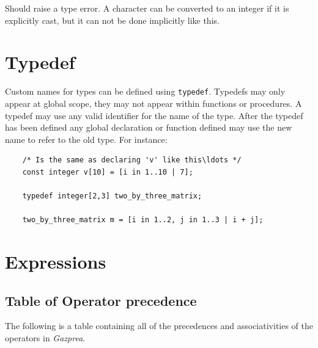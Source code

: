 \documentclass{article}
\begin{document}
  Should raise a type error. A character can be converted to an integer if it is explicitly cast, but it can not be
  done implicitly like this.


\section{Typedef}\label{sec:typedef}

  Custom names for types can be defined using \texttt{typedef}. Typedefs may only appear at global scope, they may not
  appear within functions or procedures. A typedef may use any valid identifier for the name of the type. After the
  typedef has been defined any global declaration or function defined may use the new name to refer to the old type.
  For instance:

  \begin{lstlisting}
    /* Is the same as declaring 'v' like this\ldots */
    const integer v[10] = [i in 1..10 | 7];

    typedef integer[2,3] two_by_three_matrix;

    two_by_three_matrix m = [i in 1..2, j in 1..3 | i + j];
  \end{lstlisting}


\section{Expressions}\label{sec:expressions}

  \subsection{Table of Operator precedence}\label{sec:operators}

    The following is a table containing all of the precedences and associativities of the operators in
    \textit{Gazprea}.
\end{document}
